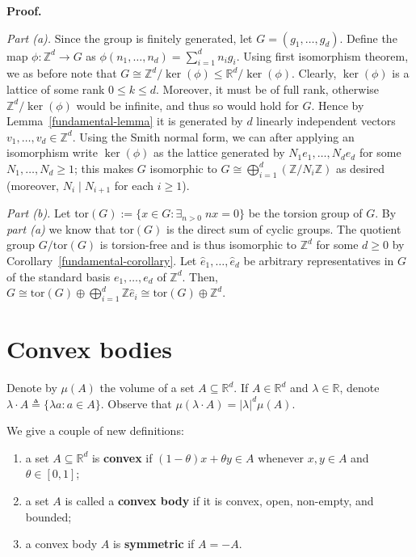 \documentclass{template-2}
\begin{document}
\textbf{Proof.} 

\textit{Part (a).} Since the group is finitely generated, let
$G=(g_1,\dots,g_d)$. Define the map $\phi: \mathbb{Z}^d \to G$ as
$\phi(n_1,\dots,n_d) = \sum_{i=1}^d n_ig_i$. Using first isomorphism theorem, we
as before note that $G \cong \mathbb{Z}^d/\ker(\phi) \leq
\mathbb{R}^d/\ker(\phi)$. Clearly, $\ker(\phi)$ is a lattice of some rank $0
\leq k \leq d$. Moreover, it must be of full rank, otherwise
$\mathbb{Z}^d/\ker(\phi)$ would be infinite, and thus so would hold for $G$.
Hence by Lemma~\ref{fundamental-lemma} it is generated by $d$ linearly independent
vectors $v_1,\dots,v_d \in \mathbb{Z}^d$. Using the Smith normal 
form, we can after applying an isomorphism write $\ker(\phi)$ as the 
lattice generated by $N_1e_1,\dots,N_de_d$ for some $N_1,\dots,N_d \geq 1$;
this makes $G$ isomorphic to $G \cong \bigoplus_{i=1}^d (\mathbb{Z}/N_i\mathbb{Z})$
as desired (moreover, $N_i \mid N_{i+1}$ for each $i \geq 1$).

\textit{Part (b).} Let $\text{tor}(G) := \{x \in G: \exists_{n>0} \; nx=0\}$ be
the torsion group of $G$. By \textit{part (a)} we know that $\text{tor}(G)$ is
the direct sum of cyclic groups. The quotient group $G/\text{tor}(G)$ is
torsion-free and is thus isomorphic to $\mathbb{Z}^d$ for some $d \geq 0$ by
Corollary~\ref{fundamental-corollary}. Let $\widehat{e}_1,\dots,\widehat{e}_d$
be arbitrary representatives in $G$ of the standard basis $e_1,\dots,e_d$ of
$\mathbb{Z}^d$. Then, $G \cong \text{tor}(G) \oplus \bigoplus_{i=1}^d
\mathbb{Z}\widehat{e}_i \cong \text{tor}(G) \oplus \mathbb{Z}^d$.

\section{Convex bodies}

Denote by $\mu(A)$ the volume of a set $A \subseteq \mathbb{R}^d$. If $A \in
\mathbb{R}^d$ and $\lambda \in \mathbb{R}$, denote $\lambda \cdot A \triangleq
\{\lambda a: a \in A\}$. Observe that $\mu(\lambda \cdot A)=|\lambda|^d\mu(A)$.

\begin{definition}\label{def:convex-set}
    We give a couple of new definitions:
    \begin{enumerate}
        \item[(a)] a set $A \subseteq \mathbb{R}^d$ is
        \textbf{convex} if $(1-\theta)x + \theta y \in A$ whenever $x,y \in A$ and
        $\theta \in [0,1]$;
        \item[(b)] a set $A$ is called a \textbf{convex body} if it is convex,
        open, non-empty, and bounded;
        \item[(c)] a convex body $A$ is \textbf{symmetric} if $A=-A$.
    \end{enumerate} 
\end{definition}
\end{document}
